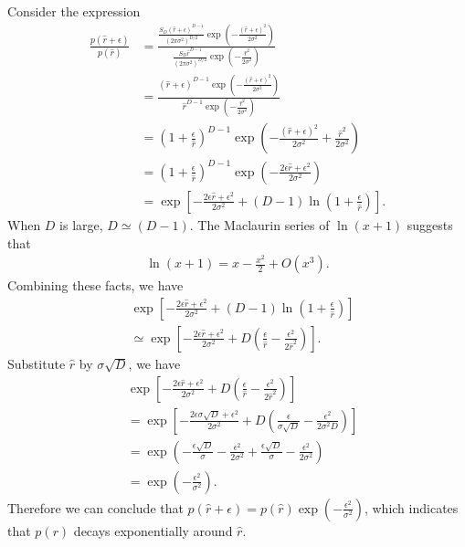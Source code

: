 \begin{answer}{}
	Consider the expression
	\begin{align}
		\frac{p(\hat{r} + \epsilon)}{p(\hat{r})} &= \frac{\frac{S_D (\hat{r} + \epsilon)^{D-1}}{(2\pi\sigma^2)^{D/2}} \exp\left( -\frac{(\hat{r} + \epsilon)^2}{2\sigma^2} \right)}{\frac{S_D \hat{r}^{D-1}}{(2\pi\sigma^2)^{D/2}} \exp\left( -\frac{\hat{r}^2}{2\sigma^2} \right)}\\
		&= \frac{(\hat{r} + \epsilon)^{D-1}\exp\left( -\frac{(\hat{r} + \epsilon)^2}{2\sigma^2} \right)}{\hat{r}^{D-1}\exp\left( -\frac{\hat{r}^2}{2\sigma^2} \right) }\\
		&= \left( 1 + \frac{\epsilon}{\hat{r}}\right)^{D - 1} \exp\left( -\frac{(\hat{r} + \epsilon)^2}{2\sigma^2} + \frac{\hat{r}^2}{2\sigma^2} \right)\\
		&= \left( 1 + \frac{\epsilon}{\hat{r}}\right)^{D - 1} \exp\left( -\frac{2\epsilon \hat{r} + \epsilon^2}{2\sigma^2} \right)\\
		&= \exp\left[ -\frac{2\epsilon \hat{r} + \epsilon^2}{2\sigma^2} + (D-1)\ln \left( 1 + \frac{\epsilon}{\hat{r}}\right) \right].
	\end{align}
	When $D$ is large, $D \simeq (D - 1)$. The Maclaurin series of $\ln(x+1)$ suggests that
	\begin{align}
		\ln(x + 1) = x - \frac{x^2}{2} + O(x^3).
	\end{align}
	Combining these facts, we have
	\begin{align}
		&\exp\left[ -\frac{2\epsilon \hat{r} + \epsilon^2}{2\sigma^2} + (D-1)\ln \left( 1 + \frac{\epsilon}{\hat{r}}\right) \right]\\
		&\simeq \exp\left[ -\frac{2\epsilon \hat{r} + \epsilon^2}{2\sigma^2} + D\left(\frac{\epsilon}{\hat{r}} - \frac{\epsilon^2}{2\hat{r}^2}\right)\right].
	\end{align}
	Substitute $\hat{r}$ by $\sigma\sqrt{D}$, we have
	\begin{align}
		&\exp\left[ -\frac{2\epsilon \hat{r} + \epsilon^2}{2\sigma^2} + D\left(\frac{\epsilon}{\hat{r}} - \frac{\epsilon^2}{2\hat{r}^2}\right)\right]\\
		&= \exp\left[ -\frac{2\epsilon\sigma\sqrt{D} + \epsilon^2}{2\sigma^2} + D\left(\frac{\epsilon}{\sigma\sqrt{D}} - \frac{\epsilon^2}{2\sigma^2D}\right) \right]\\
		&= \exp\left(-\frac{\epsilon \sqrt{D}}{\sigma} - \frac{\epsilon^2}{2\sigma^2} + \frac{\epsilon \sqrt{D}}{\sigma} - \frac{\epsilon^2}{2\sigma^2} \right)\\
		&= \exp\left( -\frac{\epsilon^2}{\sigma^2} \right).
	\end{align}
	Therefore we can conclude that $p(\hat{r} + \epsilon) = p(\hat{r}) \exp\left( -\frac{\epsilon^2}{\sigma^2} \right)$, which indicates that $p(r)$ decays exponentially around $\hat{r}$.
	

\end{answer}
